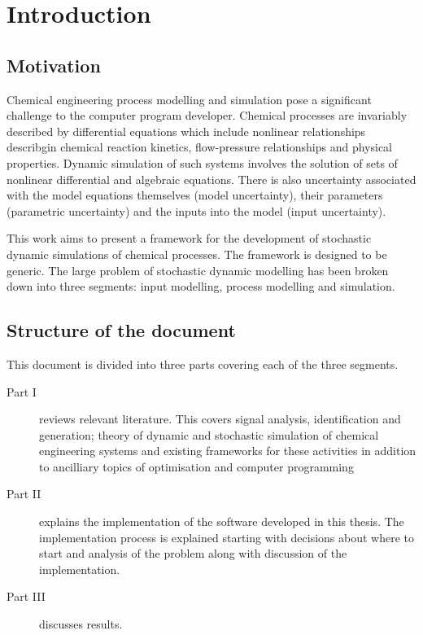 \chapter{Introduction}\label{chap:intro}

\section{Motivation}
Chemical engineering process modelling and simulation pose a significant challenge to the computer program developer.  
Chemical processes are invariably described by differential equations which include nonlinear relationships describgin chemical reaction kinetics, flow-pressure relationships and physical properties.  
Dynamic simulation of such systems involves the solution of sets of nonlinear differential and algebraic equations.
There is also uncertainty associated with the model equations themselves (model uncertainty), their parameters (parametric uncertainty) and the inputs into the model (input uncertainty).

This work aims to present a framework for the development of stochastic dynamic simulations of chemical processes. 
The framework is designed to be generic. 
The large problem of stochastic dynamic modelling has been broken down into three segments: input modelling, process modelling and simulation.

\section{Structure of the document}
This document is divided into three parts covering each of the three segments.
\begin{description}
\item[Part I] reviews relevant literature.  
	This covers signal analysis, identification and generation; theory of dynamic and stochastic simulation of chemical engineering systems and existing frameworks for these activities in addition to ancilliary topics of optimisation and computer programming
\item[Part II] explains the implementation of the software developed in this thesis.  The implementation process is explained starting with decisions about where to start and analysis of the problem along with discussion of the implementation.
\item[Part III] discusses results.  
\end{description}


